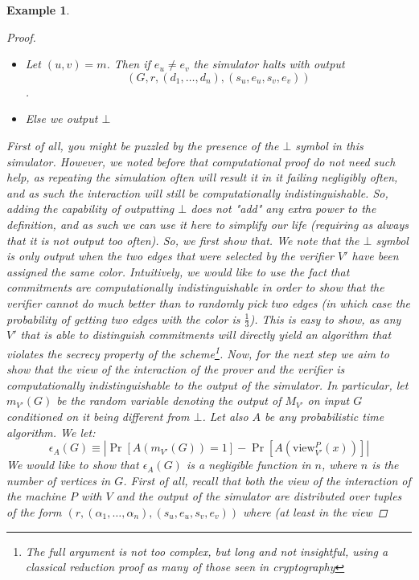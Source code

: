 \documentclass{article}
\newtheorem{example}{Example}
\begin{document}
\begin{example}
\begin{proof}
\begin{itemize}
                  assume that $m \in E$, as if it is not we can adapt $M_{V'}$ so that is selected some edge in $E$ to be used.
            \item Let $(u, v) = m$. Then if $e_u \neq e_v$ the simulator halts with output \[(G, r, (d_1, \dots, d_n), (s_u, e_u, s_v, e_v))\].
            \item Else we output $\bot$
        \end{itemize}
        First of all, you might be puzzled by the presence of the $\bot$ symbol in this simulator. 
        However, we noted before that computational proof do not need such help, as repeating the simulation often 
        will result it in it failing negligibly often, and as such the interaction will still be computationally indistinguishable.
        So, adding the capability of outputting $\bot$ does not "add" any extra power to the definition, and as such we
        can use it here to simplify our life (requiring as always that it is not output too often).
        So, we first show that. We note that the $\bot$ symbol is only output when 
        the two edges that were selected by the verifier $V'$ have been assigned the same color. 
        Intuitively, we would like to use the fact that commitments are computationally indistinguishable
        in order to show that the verifier cannot do much better than to randomly pick two edges (in which 
        case the probability of getting two edges with the color is $\frac{1}{3}$). This is easy to show,
        as any $V'$ that is able to distinguish commitments will directly yield an algorithm that violates 
        the secrecy property of the scheme\footnote{The full argument is not too complex, but long and not
        insightful, using a classical reduction proof as many of those seen in cryptography}. 
        Now, for the next step we aim to show that the view of the interaction of the prover and the verifier is 
        computationally indistinguishable to the output of the simulator. In particular, let $m_{V'}(G)$ be the 
        random variable denoting the output of $M_{V'}$ on input $G$ conditioned on it being different from $\bot$.
        Let also $A$ be any probabilistic time algorithm.
        We let:
        \[ \epsilon_A(G) \equiv \left| \Pr[A(m_{V'}(G)) = 1] - \Pr[A(\text{view}^{P}_{V'}(x))] \right| \] 
        We would like to show that $\epsilon_A(G)$ is a negligible function in $n$, where $n$ is the number 
        of vertices in $G$. First of all, recall that both the view of the interaction of the machine $P$ with $V$ 
        and the output of the simulator are distributed over tuples of the form $(r, (\alpha_1, \dots , \alpha_n), (s_u, e_u, s_v, e_v))$ where (at least in the view 

\end{proof}
\end{example}
\end{document}
